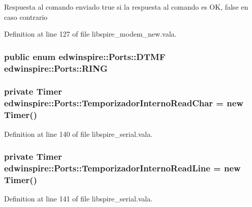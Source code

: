 Respuesta al comando enviado true si la respuesta al comando es O\-K, false en caso contrario 



Definition at line 127 of file libspire\-\_\-modem\-\_\-new.\-vala.

\hypertarget{namespaceedwinspire_1_1Ports_ab5a72276d7d7c3f2c514022e6b00ac1f}{
\subsubsection[{R\-I\-N\-G}]{\setlength{\rightskip}{0pt plus 5cm}public enum {\bf edwinspire\-::\-Ports\-::\-D\-T\-M\-F}
			 edwinspire\-::\-Ports\-::\-R\-I\-N\-G}}\label{namespaceedwinspire_1_1Ports_ab5a72276d7d7c3f2c514022e6b00ac1f}
\hypertarget{namespaceedwinspire_1_1Ports_a511c71a745dc25f1cec7d9b3977c1029}{
\subsubsection[{Temporizador\-Interno\-Read\-Char}]{\setlength{\rightskip}{0pt plus 5cm}private Timer edwinspire\-::\-Ports\-::\-Temporizador\-Interno\-Read\-Char = new Timer()}}\label{namespaceedwinspire_1_1Ports_a511c71a745dc25f1cec7d9b3977c1029}


Definition at line 140 of file libspire\-\_\-serial.\-vala.

\hypertarget{namespaceedwinspire_1_1Ports_a3fcb86d18a35e8e4926c82ffa679911a}{
\subsubsection[{Temporizador\-Interno\-Read\-Line}]{\setlength{\rightskip}{0pt plus 5cm}private Timer edwinspire\-::\-Ports\-::\-Temporizador\-Interno\-Read\-Line = new Timer()}}\label{namespaceedwinspire_1_1Ports_a3fcb86d18a35e8e4926c82ffa679911a}


Definition at line 141 of file libspire\-\_\-serial.\-vala.

